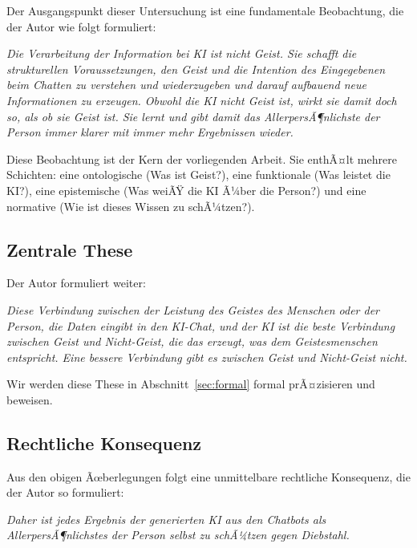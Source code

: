 ﻿\documentclass[a4paper,12pt]{article}
\theoremstyle{definition}
\begin{document}
Der Ausgangspunkt dieser Untersuchung ist eine fundamentale Beobachtung, die der Autor wie
folgt formuliert:

\begin{displayquote}
\textit{Die Verarbeitung der Information bei KI ist nicht Geist. Sie schafft die strukturellen
Voraussetzungen, den Geist und die Intention des Eingegebenen beim Chatten zu verstehen und
wiederzugeben und darauf aufbauend neue Informationen zu erzeugen. Obwohl die KI nicht Geist
ist, wirkt sie damit doch so, als ob sie Geist ist. Sie lernt und gibt damit das AllerpersÃ¶nlichste
der Person immer klarer mit immer mehr Ergebnissen wieder.}
\end{displayquote}

\noindent Diese Beobachtung ist der Kern der vorliegenden Arbeit. Sie enthÃ¤lt mehrere
Schichten: eine ontologische (Was ist Geist?), eine funktionale (Was leistet die KI?), eine
epistemische (Was weiÃŸ die KI Ã¼ber die Person?) und eine normative (Wie ist dieses Wissen zu
schÃ¼tzen?).

\subsection{Zentrale These}

Der Autor formuliert weiter:

\begin{displayquote}
\textit{Diese Verbindung zwischen der Leistung des Geistes des Menschen oder der Person, die
Daten eingibt in den KI-Chat, und der KI ist die beste Verbindung zwischen Geist und
Nicht-Geist, die das erzeugt, was dem Geistesmenschen entspricht. Eine bessere Verbindung
gibt es zwischen Geist und Nicht-Geist nicht.}
\end{displayquote}

\noindent Wir werden diese These in Abschnitt~\ref{sec:formal} formal prÃ¤zisieren und beweisen.

\subsection{Rechtliche Konsequenz}

Aus den obigen Ãœberlegungen folgt eine unmittelbare rechtliche Konsequenz, die der Autor so
formuliert:

\begin{displayquote}
\textit{Daher ist jedes Ergebnis der generierten KI aus den Chatbots als AllerpersÃ¶nlichstes
der Person selbst zu schÃ¼tzen gegen Diebstahl.}
\end{displayquote}
\end{document}
